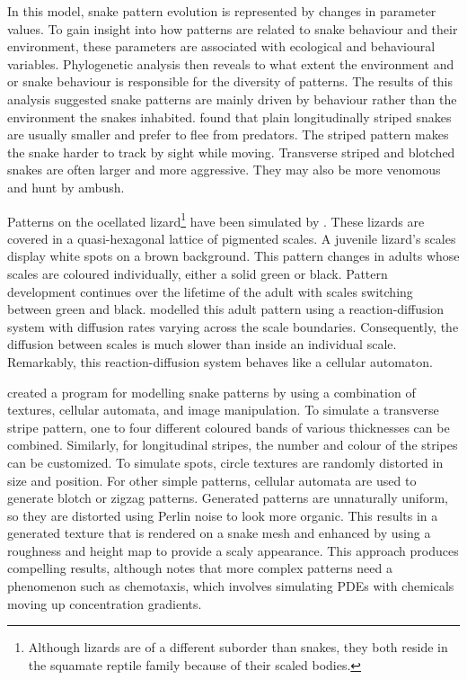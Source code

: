  In this model, snake pattern evolution is represented by changes in parameter values. To gain insight into how patterns are related to snake behaviour and their environment, these parameters are associated with ecological and behavioural variables. Phylogenetic analysis then reveals to what extent the environment and or snake behaviour is responsible for the diversity of patterns. The results of this analysis suggested snake patterns are mainly driven by behaviour rather than the environment the snakes inhabited. \citet{allen2013} found that plain longitudinally striped snakes are usually smaller and prefer to flee from predators. The striped pattern makes the snake harder to track by sight while moving. Transverse striped and blotched snakes are often larger and more aggressive. They may also be more venomous and hunt by ambush.

Patterns on the ocellated lizard\footnote{Although lizards are of a different suborder than snakes, they both reside in the squamate reptile family because of their scaled bodies.} have been simulated by \citet{manukyan2017}. These lizards are covered in a quasi-hexagonal lattice of pigmented scales. A juvenile lizard's scales display white spots on a brown background. This pattern changes in adults whose scales are coloured individually, either a solid green or black. Pattern development continues over the lifetime of the adult with scales switching between green and black. \citet{manukyan2017} modelled this adult pattern using a reaction-diffusion system with diffusion rates varying across the scale boundaries. Consequently, the diffusion between scales is much slower than inside an individual scale. Remarkably, this reaction-diffusion system behaves like a cellular automaton.

\citet{pinheiro2017} created a program for modelling snake patterns by using a combination of textures, cellular automata, and image manipulation. To simulate a transverse stripe pattern, one to four different coloured bands of various thicknesses can be combined. Similarly, for longitudinal stripes, the number and colour of the stripes can be customized. To simulate spots, circle textures are randomly distorted in size and position. For other simple patterns, cellular automata are used to generate blotch or zigzag patterns. Generated patterns are unnaturally uniform, so they are distorted using Perlin noise to look more organic. This results in a generated texture that is rendered on a snake mesh and enhanced by using a roughness and height map to provide a scaly appearance. This approach produces compelling results, although \citet{pinheiro2017} notes that more complex patterns need a phenomenon such as chemotaxis, which involves simulating PDEs with chemicals moving up concentration gradients.

